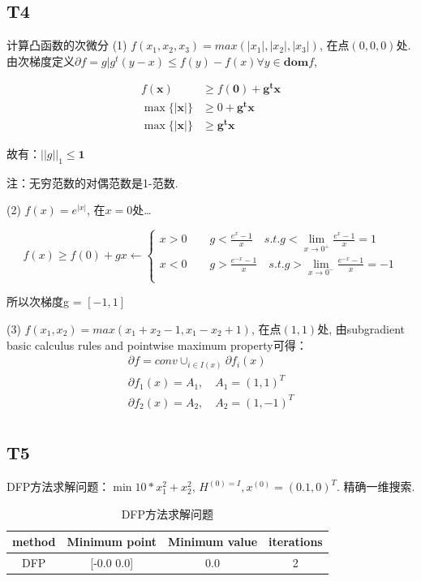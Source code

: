 \documentclass[a4paper]{article}
\begin{document}
    \subsection*{T4}
    计算凸函数的次微分
    (1) $f(x_1, x_2, x_3) = max(|x_1|, |x_2|, |x_3|)$, 在点$(0,0,0)$处. 
        由次梯度定义$\partial f = {g | g^t(y-x) \le f(y)-f(x)} \forall y \in \mathbf{dom} f$,

        \begin{align*}
            f(\mathbf{x}) &\ge f(\mathbf{0})+ \mathbf{g^t} \mathbf{x} \\
            \max \{ |\mathbf{x}| \} &\ge 0 + \mathbf{g^t} \mathbf{x}  \\
            \max \{ |\mathbf{x}| \} &\ge  \mathbf{g^t} \mathbf{x} 
        \end{align*}
        
        故有：$|| g||_1 \le \mathbf{1}$

        注：无穷范数的对偶范数是1-范数.

    (2) $f(x) = e^{|x|}$, 在$x=0$处\dots
        
        \begin{equation*}
            f(x) \ge f(0) + gx \leftarrow
            \begin{cases}
                x>0 \quad \quad g < \frac{e^x -1 }{x} \quad s.t. g< \lim_{x \to 0^+}\frac{e^x -1 }{x}  = 1\\
                x<0 \quad \quad g > \frac{e^{-x} -1 }{x} \quad s.t. g> \lim_{x \to 0^-}\frac{e^{-x} -1 }{x} = -1 \\
            \end{cases} 
        \end{equation*}

        所以次梯度g = $[-1,1]$
        
    (3) $f(x_1, x_2) = max (x_1+x_2-1, x_1-x_2+1)$, 在点$(1,1)$处,
        由subgradient basic calculus rules and pointwise maximum property可得：
        \begin{gather*}
            \partial f = conv \cup_{i \in I(x)} \partial f_i(x) \\
            \partial f_1(x) = A_1 , \quad A_1 = (1, 1)^T \\
            \partial f_2(x) = A_2 , \quad A_2 = (1, -1)^T \\
        \end{gather*}

    \subsection*{T5}
        DFP方法求解问题：$\min 10*x_1^2 + x_2^2 $, $H^{(0) = I}, x^{(0)} = (0.1,0)^T$. 精确一维搜索. 
        \begin{table}[h!]
        \centering
        \begin{tabular}{cccc}
            \toprule
            method  &  Minimum point & Minimum value & iterations  \\
            \midrule
            DFP & [-0.0  0.0] & 0.0 & 2\\
            \bottomrule
        \end{tabular}
        \caption{DFP方法求解问题}
        \end{table}
\end{document}
